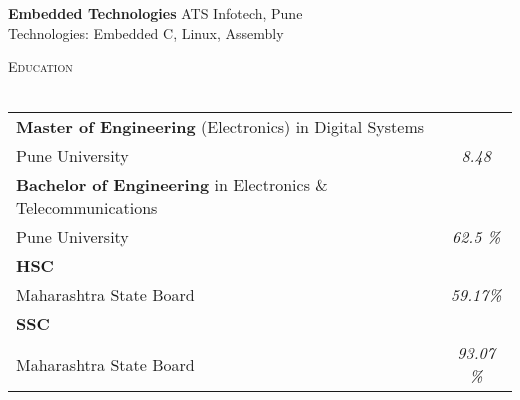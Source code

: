 \documentclass[a4paper]{article}
\newcommand{\lineunder} {
    \vspace*{-8pt} \\
    \hspace*{-18pt} \hrulefill \\
}
\newcommand{\header} [1] {
    {\hspace*{-18pt}\vspace*{6pt} \textsc{#1}}
    \vspace*{-6pt} \lineunder
}
\begin{document}
\textbf{Embedded Technologies} \hfill ATS Infotech, Pune\\
Technologies: Embedded C, Linux, Assembly\\
\vspace*{2mm}

\header{Education}
\vspace{1mm}
\bgroup
\def\arraystretch{1.2}
\begin{tabularx}{\textwidth}{ | X | c | }
  \hline

\textbf{Master of Engineering} (Electronics) in Digital Systems & \\
Pune University & \textit{8.48} \\
  \hline

\textbf{Bachelor of Engineering} in Electronics \& Telecommunications & \\
Pune University & \textit{62.5 \%} \\
  \hline

\textbf{HSC} &\\
Maharashtra State Board & \textit{59.17\%}  \\
  \hline

  \textbf{SSC} & \\
Maharashtra State Board & \textit{93.07 \%} \\
  \hline

\end{tabularx}
\egroup
\vspace{2mm}
\end{document}
